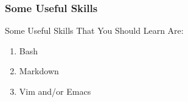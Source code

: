 \begin{frame}
\frametitle{\large{Some Useful Skills}}
Some Useful Skills That You Should Learn Are:
\begin{enumerate}
\item Bash
\item Markdown
\item Vim and/or Emacs
\end{enumerate}
\end{frame}
\note{}
